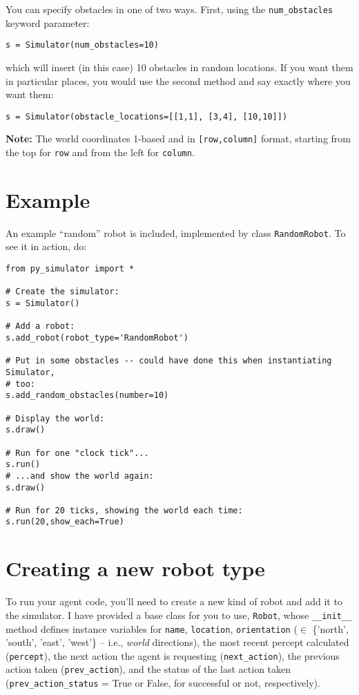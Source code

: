 \documentclass[11pt]{tufte-handout}
\begin{document}
You can specify obstacles in one of two ways.  First, using the \texttt{num\_obstacles} keyword parameter:
\begin{verbatim}
s = Simulator(num_obstacles=10)
\end{verbatim}

\noindent
\noindent which will insert (in this case) 10 obstacles in random locations.  If you want them in particular places, you would use the second method and say exactly where you want them:
\begin{verbatim}
s = Simulator(obstacle_locations=[[1,1], [3,4], [10,10]])
\end{verbatim}

\noindent \textbf{Note:} The world coordinates 1-based and in \texttt{[row,column]} format, starting from the top for \texttt{row} and from the left for \texttt{column}.

\section{Example}
\label{sec:orgd5c3dcc}
An example ``random'' robot is included, implemented by class \texttt{RandomRobot}.  To see it in action, do:
\begin{verbatim}
from py_simulator import *

# Create the simulator:
s = Simulator()

# Add a robot:
s.add_robot(robot_type='RandomRobot')

# Put in some obstacles -- could have done this when instantiating Simulator,
# too:
s.add_random_obstacles(number=10)

# Display the world:
s.draw()

# Run for one "clock tick"...
s.run()
# ...and show the world again:
s.draw()

# Run for 20 ticks, showing the world each time:
s.run(20,show_each=True)
\end{verbatim}

\section{Creating a new robot type}
\label{sec:orga087d47}

To run your agent code, you'll need to create a new kind of robot and add it to the simulator.  I have provided a base class for you to use, \texttt{Robot}, whose \texttt{\_\_init\_\_} method defines instance variables for \texttt{name}, \texttt{location}, \texttt{orientation} (\(\in\) \{'north', 'south', 'east', 'west'\} -- i.e., \emph{world} directions), the most recent percept calculated (\texttt{percept}), the next action the agent is requesting (\texttt{next\_action}), the previous action taken (\texttt{prev\_action}), and the status of the last action taken (\texttt{prev\_action\_status} = True or False, for successful or not, respectively).
\end{document}

